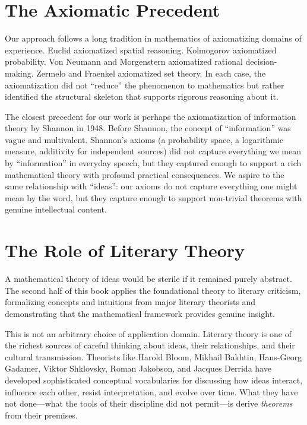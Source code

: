 \documentclass[11pt,openany]{book}
\theoremstyle{definition}
\theoremstyle{plain}
\theoremstyle{remark}
\begin{document}
\section{The Axiomatic Precedent}

Our approach follows a long tradition in mathematics of axiomatizing domains of experience. Euclid axiomatized spatial reasoning. Kolmogorov axiomatized probability. Von Neumann and Morgenstern axiomatized rational decision-making. Zermelo and Fraenkel axiomatized set theory. In each case, the axiomatization did not ``reduce'' the phenomenon to mathematics but rather identified the structural skeleton that supports rigorous reasoning about it.

The closest precedent for our work is perhaps the axiomatization of information theory by Shannon in 1948. Before Shannon, the concept of ``information'' was vague and multivalent. Shannon's axioms (a probability space, a logarithmic measure, additivity for independent sources) did not capture everything we mean by ``information'' in everyday speech, but they captured enough to support a rich mathematical theory with profound practical consequences. We aspire to the same relationship with ``ideas'': our axioms do not capture everything one might mean by the word, but they capture enough to support non-trivial theorems with genuine intellectual content.

\section{The Role of Literary Theory}

A mathematical theory of ideas would be sterile if it remained purely abstract. The second half of this book applies the foundational theory to literary criticism, formalizing concepts and intuitions from major literary theorists and demonstrating that the mathematical framework provides genuine insight.

This is not an arbitrary choice of application domain. Literary theory is one of the richest sources of careful thinking about ideas, their relationships, and their cultural transmission. Theorists like Harold Bloom, Mikhail Bakhtin, Hans-Georg Gadamer, Viktor Shklovsky, Roman Jakobson, and Jacques Derrida have developed sophisticated conceptual vocabularies for discussing how ideas interact, influence each other, resist interpretation, and evolve over time. What they have not done---what the tools of their discipline did not permit---is derive \emph{theorems} from their premises.
\end{document}

